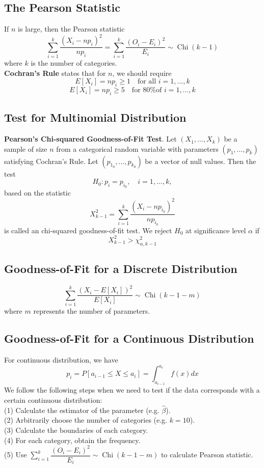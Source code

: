 \documentclass[a4paper,12pt]{article}
\begin{document}
\subsection{The Pearson Statistic}
If $n$ is large, then the Pearson statistic
\begin{equation}
    \sum_{i=1}^k\dfrac{(X_i-np_i)^2}{np_i}  =  \sum_{i=1}^k\dfrac{(O_i-E_i)^2}{E_i}\sim \operatorname{Chi}(k-1) 
\end{equation}
where $k$ is the number of categories.\\
\textbf{Cochran's Rule} states that for $n$, we should require
$$
E[X_i] = np_i \geq 1 \quad \text{for all } i=1,...,k 
$$
$$
E[X_i] = np_i \geq 5 \quad \text{for 80\% of } i=1,...,k 
$$

\subsection{Test for Multinomial Distribution}
\textbf{Pearson's Chi-squared Goodness-of-Fit Test}. Let $\left(X_1, \ldots, X_k\right)$ be a sample of size $n$ from a categorical random variable with parameters $\left(p_1, \ldots, p_k\right)$ satisfying Cochran's Rule. Let $\left(p_{1_0}, \ldots, p_{k_0}\right)$ be a vector of null values. Then the test
$$
H_0: p_i=p_{i_0}, \quad i=1, \ldots, k,
$$
based on the statistic
\begin{equation}
X_{k-1}^2=\sum_{i=1}^k \frac{\left(X_i-n p_{i_0}\right)^2}{n p_{i_0}}
\end{equation}
is called an chi-squared goodness-of-fit test.
We reject $H_0$ at significance level $\alpha$ if 
$$X_{k-1}^2>\chi_{\alpha, k-1}^2$$

\subsection{Goodness-of-Fit for a Discrete Distribution}
\begin{equation}
\sum_{i=1}^k\dfrac{(X_i-E[X_i])^2}{E[X_i]}\sim \operatorname{Chi}(k-1-m)
\label{goodness}
\end{equation}
where $m$ represents the number of parameters.

\subsection{Goodness-of-Fit for a Continuous Distribution}
For continuous distribution, we have
$$
p_i=P[a_{i-1}\leq X \leq a_i] = \int_{a_{i-1}}^{a_i}f(x)dx
$$
We follow the following steps when we need to test if the data corresponds with a certain continuous distribution:\\
(1) Calculate the estimator of the parameter (e.g. $\hat{\beta}$).\\
(2) Arbitrarily choose the number of categories (e.g. $k=10$).\\
(3) Calculate the boundaries of each category.\\
(4) For each category, obtain the frequency.\\
(5) Use $\sum_{i=1}^k\dfrac{(O_i-E_i)^2}{E_i}\sim \operatorname{Chi}(k-1-m)$
to calculate Pearson statistic.
\end{document}
